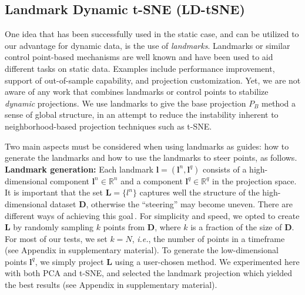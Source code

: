 \subsection{Landmark Dynamic t-SNE (LD-tSNE)}
\label{sec:ld-tsne}
%
One idea that has been successfully used in the static case, and can be utilized to our advantage for dynamic data, is the use of \emph{landmarks}. 
Landmarks or similar control point-based mechanisms are well known and have been used to aid different tasks on static data. Examples include performance improvement\citep{Pekalska1999,DeSilva2003,DeSilva2004,Vladymyrov2013,Paulovich2008,Kruiger2017a}, support of out-of-sample capability\citep{Boytsov2017,Policar2019}, and projection customization\citep{Joia2011,updis}.
Yet, we are not aware of any work that combines landmarks or control points to stabilize \emph{dynamic} projections. We use landmarks to give the base projection $P_B$ method a sense of global structure, in an attempt to reduce the instability inherent to neighborhood-based projection techniques such as t-SNE.

Two main aspects must be considered when using landmarks as guides: how to generate the landmarks and how to use the landmarks to steer points, as follows.\\

\vspace{-0.15cm}
\noindent\textbf{Landmark generation:} Each landmark $\mathbf{l}=\left(\mathbf{l}^n, \mathbf{l}^q\right)$ consists of a high-dimensional component $\mathbf{l}^n \in \mathbb{R}^n$ and a component $\mathbf{l}^q \in \mathbb{R}^q$ in the projection space.
It is important that the set $\mathbf{L} = \{ l^n \}$ captures well the structure of the high-dimensional dataset $\mathbf{D}$, otherwise the ``steering'' may become uneven. There are different ways of achieving this goal\,\citep{DeSilva2005}. For simplicity and speed, we opted to create $\mathbf{L}$ by randomly sampling $k$ points from $\mathbf{D}$, where $k$ is a fraction of the size of $\mathbf{D}$. For most of our tests, we set $k=N$, \emph{i.e.}, the number of points in a timeframe (see Appendix in supplementary material). To generate the low-dimensional points $\mathbf{l}^q$, we simply project $\mathbf{L}$ using a user-chosen method. We experimented here with both PCA and t-SNE, and selected the landmark projection which yielded the best results (see Appendix in supplementary material).\\


